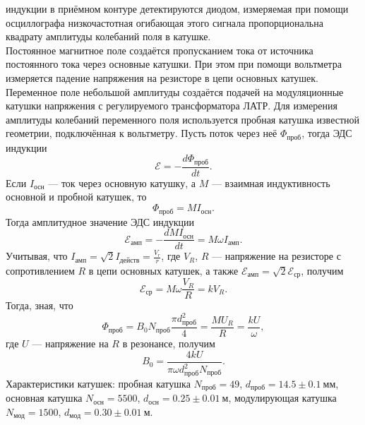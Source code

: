 \documentclass[%
reprint,
amsmath,amssymb,
aps,
]{revtex4-2}
\begin{document}
индукции в приёмном контуре детектируются диодом, измеряемая при помощи
осциллографа низкочастотная огибающая этого сигнала пропорциональна квадрату
амплитуды колебаний поля в катушке.\\
Постоянное магнитное поле создаётся пропусканием тока от источника постоянного тока через основные катушки. При этом при помощи вольтметра измеряется падение напряжения на резисторе в цепи основных катушек. Переменное поле небольшой амплитуды создаётся подачей на модуляционные катушки напряжения с регулируемого трансформатора ЛАТР. Для измерения амплитуды колебаний переменного поля используется пробная катушка известной геометрии, подключённая к вольтметру. Пусть поток через неё $\Phi_{\text{проб}}$, тогда ЭДС индукции
\[\mathcal{E} = - \dfrac{d\Phi_{\text{проб}}}{dt}.\]
Если $I_{\text{осн}}$ — ток через основную катушку, а $M$ — взаимная индуктивность основной и пробной катушек, то
\[\Phi_{\text{проб}} = M I_{\text{осн}}.\]
Тогда амплитудное значение ЭДС индукции
\[\mathcal{E}_{\text{амп}} = - \dfrac{dM I_{\text{осн}}}{dt} = M \omega I_{\text{амп}}.\]
Учитывая, что $I_{\text{амп}} = \sqrt{2} I_{\text{действ}}=\frac{V_r}{r}$, где $V_R$, $R$ — напряжение на резисторе с сопротивлением $R$ в цепи основных катушек, а также $\mathcal{E}_{\text{амп}} = \sqrt{2}\mathcal{E}_{\text{ср}}$, получим
\[\mathcal{E}_{\text{ср}} = M \omega \dfrac{V_R}{R} = k V_R.\]
Тогда, зная, что
\[\Phi_{\text{проб}} = B_0 N_{\text{проб}} \dfrac{\pi d_{\text{проб}}^2}{4} = \dfrac{MU_R}{R} = \dfrac{k U}{\omega},\]
где $U$ — напряжение на $R$ в резонансе, получим
\begin{equation}\label{1}
B_0 = \dfrac{4k U}{\pi \omega d^2_{\text{проб}} N_{\text{проб}}}.
\end{equation}
Характеристики катушек: пробная катушка $N_{\text{проб}} = 49$, $d_{\text{проб}} = 14.5\pm 0.1~\text{мм}$, основная катушка $N_{\text{осн}} = 5500$, $d_{\text{осн}} = 0.25\pm 0.01~\text{м}$, модулирующая катушка $N_{\text{мод}} = 1500$, $d_{\text{мод}} = 0.30\pm 0.01~\text{м}$.
\end{document}
